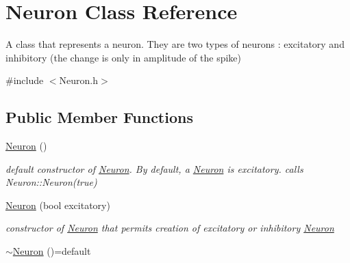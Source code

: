 \hypertarget{classNeuron}{}\section{Neuron Class Reference}
\label{classNeuron}


A class that represents a neuron. They are two types of neurons \+: excitatory and inhibitory (the change is only in amplitude of the spike)  




{\ttfamily \#include $<$Neuron.\+h$>$}

\subsection*{Public Member Functions}
\begin{DoxyCompactItemize}
\item 
\hyperlink{classNeuron_a823487d01615fadb8ac19a2768dd9d96}{Neuron} ()
\begin{DoxyCompactList}\small\item\em default constructor of \hyperlink{classNeuron}{Neuron}. By default, a \hyperlink{classNeuron}{Neuron} is excitatory. calls Neuron\+::\+Neuron(true) \end{DoxyCompactList}\item 
\hyperlink{classNeuron_af1ec9cf091aa834daf3078d02e2ad75a}{Neuron} (bool excitatory)
\begin{DoxyCompactList}\small\item\em constructor of \hyperlink{classNeuron}{Neuron} that permits creation of excitatory or inhibitory \hyperlink{classNeuron}{Neuron} \end{DoxyCompactList}\item 
\hyperlink{classNeuron_a7350045966914cd4bcddac6706e7d864}{$\sim$\+Neuron} ()=default\hypertarget{classNeuron_a7350045966914cd4bcddac6706e7d864}{}\label{classNeuron_a7350045966914cd4bcddac6706e7d864}


\end{DoxyCompactItemize}
